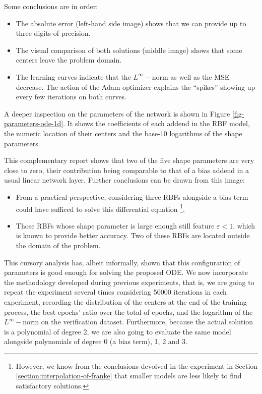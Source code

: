 \documentclass[12pt]{report} %
\begin{document}
Some conclusions are in order:
\begin{itemize}
  \item The absolute error (left-hand side image) shows that we can provide up to three digits
        of precision.
  \item The visual comparison of both solutions (middle image) shows that
        some centers leave the problem domain.
  \item The learning curves indicate that the $L^\infty-$norm as well as the MSE decrease.
        The action of the Adam optimizer explains the ``spikes'' showing up every few iterations
        on both curves.
\end{itemize}

A deeper inspection on the parameters of the network is shown in Figure \ref{fig-parameters-ode-1d}.
It shows the coefficients of each addend in the RBF model, the numeric location of
their centers and the base-10 logarithms of the shape parameters.

This complementary report shows that two of the five shape parameters are very close to zero,
their contribution being comparable to that of a bias addend in a usual linear network layer.
Further conclusions can be drawn from this image:
\begin{itemize}
  \item From a practical perspective, considering three
        RBFs alongside a bias term could have sufficed to solve this differential equation
        \footnote{However, we know from the conclusions devolved in the experiment in Section
          \ref{section:interpolation-of-franke} that smaller models are less likely to find
          satisfactory solutions.}.
  \item Those RBFs whose shape parameter is large enough still feature $\varepsilon<1$, which is
        known to provide better accuracy. Two of these RBFs are located outside the
        domain of the problem.
\end{itemize}

This cursory analysis has, albeit informally, shown that this configuration of parameters
is good enough for solving the proposed ODE. We now incorporate the
methodology developed during previous experiments, that is, we are going to repeat the experiment
several times considering 50000 iterations in each experiment,
recording the distribution of the centers at the end of the training
process, the best epochs' ratio over the total of epochs, and the logarithm of the $L^\infty-$norm
on the verification dataset. Furthermore,
because the actual solution is a polynomial
of degree 2, we are also going to evaluate the same model alongside polynomials of degree 0
(a bias term), 1, 2 and 3.
\end{document}

